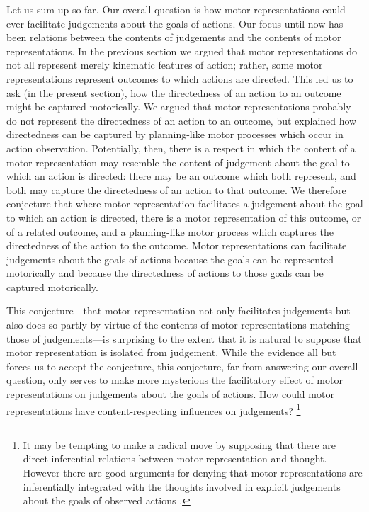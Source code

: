\documentclass[12pt,\papersize]{extarticle}
\begin{document}
Let us sum up so far. Our overall question is how motor representations could ever facilitate judgements about the goals of actions.  Our focus until now has been relations between the contents of judgements and the contents of motor representations.  
In the previous section we argued that motor representations do not all represent merely kinematic features of action; rather, some motor representations represent outcomes to which actions are directed.  
This led us to ask (in the present section), how the directedness of an action to an outcome might be captured motorically.
We argued that motor representations probably do not represent the directedness of an action to an outcome, but explained how directedness can be captured by planning-like motor processes which occur in action observation.  Potentially, then, there is a respect in which the content of a motor representation may resemble the content of judgement about the goal to which an action is directed: there may be an outcome which both represent, and both may  capture the directedness of an action to that outcome.  
We therefore conjecture that where motor representation facilitates a judgement about the goal to which an action is directed,
there is a motor representation of this outcome, or of a related outcome, and a planning-like motor process which captures the directedness of the action to the outcome.  Motor representations can facilitate judgements about the goals of actions because the goals can be represented motorically and because the directedness of actions to those goals can be captured motorically.

This conjecture---that motor representation not only facilitates judgements but also does so partly by virtue of the contents of motor representations matching those of judgements---is surprising to the extent that it is natural to suppose that motor representation is isolated from judgement.  While the evidence all but forces us to accept the conjecture, this conjecture, far from answering our overall question, only serves to make more mysterious the facilitatory effect of motor representations on judgements about the goals of actions. How could motor representations have content-respecting influences on judgements?%
\footnote{
It may be tempting to make a radical move by supposing that there are direct inferential relations between motor representation and thought.  However there are good arguments for denying that motor representations are inferentially integrated with the thoughts involved in explicit judgements about the goals of observed actions \citep{butterfill:2012_intention}.
}
\end{document}
